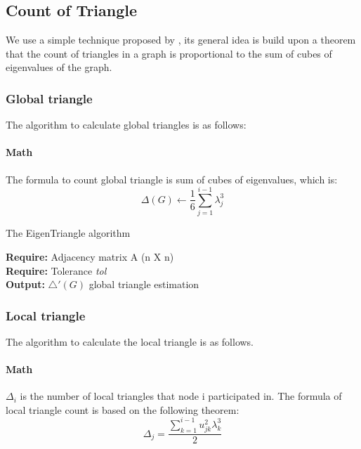 \subsection{Count of Triangle}
We use a simple technique proposed by \cite{tsourakakis2008fast}, its general idea is build upon a theorem that the count of triangles in a graph is proportional to the sum of cubes of eigenvalues of the graph. 


\subsubsection{Global triangle}
The algorithm to calculate global triangles is as follows:

\paragraph{Math}
The formula to count global triangle is sum of cubes of eigenvalues, which is:
\begin{equation}
    \Delta(G) \gets \frac{1}{6} \sum_{j=1}^{i-1}\lambda_{j}^{3}
\end{equation}

\begin{algorithm}[!htbf]
\caption{The EigenTriangle algorithm}
{\bf Require: } Adjacency matrix A (n X n)\\
{\bf Require: } Tolerance \emph{tol}\\
{\bf Output: } $\bigtriangleup'(G)$ global triangle estimation
\begin{algorithmic}
\STATE{$\overrightarrow{\Lambda} \gets [\lambda_{1}]$}
\REPEAT 
\end{algorithmic}
\end{algorithm}

\subsubsection{Local triangle}
The algorithm to calculate the local triangle is as follows.

\paragraph{Math}
$\Delta_{i}$ is the number of local triangles that node i participated in. The formula of local triangle count is based on the following theorem:
\begin{equation}
    \Delta_{j} = \frac{\sum_{k=1}^{i-1}u_{jk}^{2}\lambda_{k}^{3}}{2}
\end{equation}


